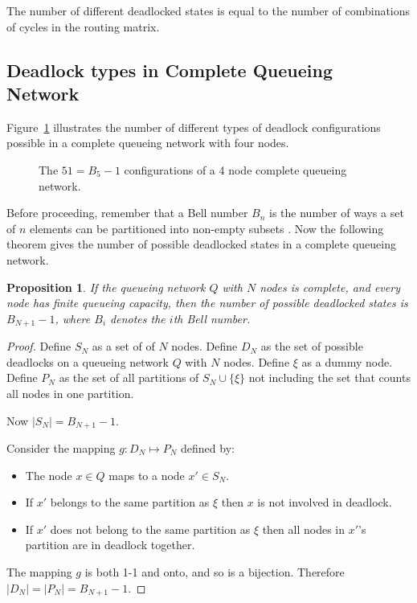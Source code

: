\documentclass{article}
\newtheorem{proposition}{Proposition}
\begin{document}
The number of different deadlocked states is equal to the number of combinations of cycles in the routing matrix.

\subsection{Deadlock types in Complete Queueing Network}

Figure~\ref{fig:4nodecombinations} illustrates the number of different types of deadlock configurations possible in a complete queueing network with four nodes.

\begin{figure}[!htbp]
  \begin{center}
    
  \end{center}
  \caption{The $51 = B_5-1$ configurations of a 4 node complete queueing network.}
  \label{fig:4nodecombinations}
\end{figure}

Before proceeding, remember that a Bell number $B_n$ is the number of ways a set of $n$ elements can be partitioned into non-empty subsets \cite{cameron94}.
Now the following theorem gives the number of possible deadlocked states in a complete queueing network.\\

\begin{proposition}
  If the queueing network $Q$ with $N$ nodes is complete, and every node has finite queueing capacity, then the number of possible deadlocked states is $B_{N+1} - 1$, where $B_i$ denotes the $i$th Bell number.
\end{proposition}

\begin{proof}

Define $S_N$ as a set of of $N$ nodes.
Define $D_N$ as the set of possible deadlocks on a queueing network $Q$ with $N$ nodes.
Define $\xi$ as a dummy node.
Define $P_N$ as the set of all partitions of $S_N\cup\{\xi\}$ not including the set that counts all nodes in one partition.

Now $|S_N| = B_{N+1}-1$.

Consider the mapping $g:D_N \mapsto P_N$ defined by:

\begin{itemize}
  \item The node $x \in Q$ maps to a node $x' \in S_N$.
  \item If $x'$ belongs to the same partition as $\xi$ then $x$ is not involved in deadlock.
  \item If $x'$ does not belong to the same partition as $\xi$ then all nodes in $x'$'s partition are in deadlock together.
\end{itemize}

The mapping $g$ is both 1-1 and onto, and so is a bijection.
Therefore $|D_N| = |P_N| = B_{N+1}-1$.

\end{proof}
\end{document}
